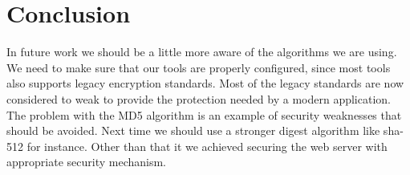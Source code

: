 \section {Conclusion} %

In future work we should be a little more aware of the algorithms we are using. We need to make sure that our tools are properly configured, since most tools also supports legacy encryption standards. Most of the legacy standards are now considered to weak to provide the protection needed by a modern application.  The problem with the MD5 algorithm is an example of security weaknesses that should be avoided. Next time we should use a stronger digest algorithm like sha-512 for instance. Other than that it we achieved securing the web server with appropriate security mechanism. 

